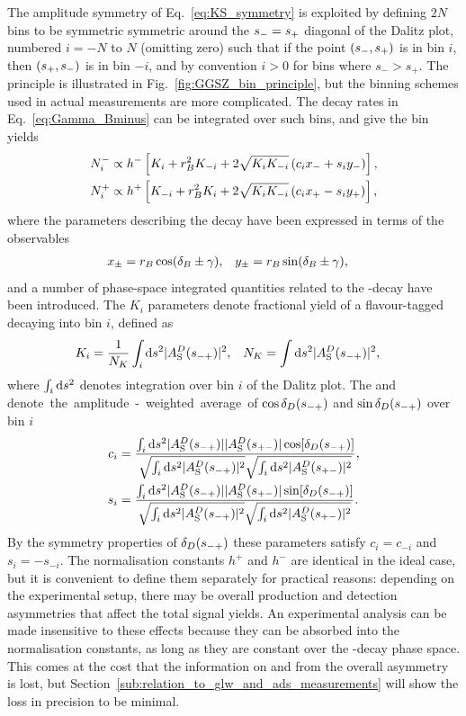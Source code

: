 The amplitude symmetry of Eq.~\eqref{eq:KS_symmetry} is exploited by defining $2N$ bins to be symmetric symmetric around the $s_-=s_+$ diagonal of the Dalitz plot, numbered $i=-N$ to $N$ (omitting zero) such that if the point $(s_-, s_+)$ is in bin $i$, then $(s_+, s_-)$ is in bin $-i$, and by convention $i>0$ for bins where $s_- >s_+$. The principle is illustrated in Fig.~\ref{fig:GGSZ_bin_principle}, but the binning schemes used in actual measurements are more complicated. The decay rates in Eq.~\eqref{eq:Gamma_Bminus} can be integrated over such bins, and give the bin yields
\begin{align}
\begin{split}    \label{eq:base_GGSZ_yields}
    N^-_i &\propto h^- \left[K_i + r_{B}^2K_{-i} + 2\sqrt{K_iK_{-i}}\left(c_ix_-+s_iy_-\right)\right], \\
    N^+_i &\propto h^+ \left[K_{-i} + r_{B}^2K_i + 2\sqrt{K_iK_{-i}}\left(c_ix_+-s_iy_+\right)\right],
\end{split}
\end{align}
where the parameters describing the \B decay have been expressed in terms of the observables
\begin{align}
    x_\pm &= r_{B} \cos (\delta_{B} \pm \gamma), & y_\pm &= r_{B} \sin (\delta_{B} \pm \gamma),
\end{align}
 and a number of phase-space integrated quantities related to the \D-decay have been introduced. The $K_i$ parameters denote fractional yield of a flavour-tagged \Dz decaying into bin $i$, defined as
\begin{align}\label{eq:base_ki}
    K_i &= \frac{1}{N_K}\int_i\text{d}s^2 |A_{\rm S}^{D}(s_{-+})|^2, &
    N_K &=\int\text{d}s^2 |A_{\rm S}^{D}(s_{-+})|^2,
\end{align}
where $\int_i \text d s^2$ denotes integration over bin $i$ of the Dalitz plot. The \ci and \si denote the amplitude-weighted average of $\cos \delta_D(s_{-+})$ and $\sin \delta_D(s_{-+})$ over bin $i$
\begin{align}\label{eq:ci_si}
\begin{split}
    c_i &= \frac
    {\int_i \text{d}s^2 |A_{\rm S}^{D}(s_{-+})||A_{\rm S}^{D}(s_{+-})|\cos[\delta_D(s_{-+})]}
    {\sqrt{\int_i \text{d}s^2 |A_{\rm S}^{D}(s_{-+})|^2}\sqrt{\int_i \text{d}s^2 |A_{\rm S}^{D}(s_{+-})|^2}}, \\
    s_i &= \frac
    {\int_i \text{d}s^2 |A_{\rm S}^{D}(s_{-+})||A_{\rm S}^{D}(s_{+-})|\sin[\delta_D(s_{-+})]}
    {\sqrt{\int_i \text{d}s^2 |A_{\rm S}^{D}(s_{-+})|^2}\sqrt{\int_i \text{d}s^2 |A_{\rm S}^{D}(s_{+-})|^2}}.
\end{split}
\end{align}
By the symmetry properties of $\delta_D(s_{-+})$ these parameters satisfy ${c_i=c_{-i}}$ and ${s_i=-s_{-i}}$. The normalisation constants $h^+$ and $h^-$ are identical in the ideal case, but it is convenient to define them separately for practical reasons: depending on the experimental setup, there may be overall production and detection asymmetries that affect the total signal yields. An experimental analysis can be made insensitive to these effects because they can be absorbed into the normalisation constants, as long as they are constant over the \D-decay phase space. This comes at the cost that the information on \xpm and \ypm from the overall \CP asymmetry is lost, but Section~\ref{sub:relation_to_glw_and_ads_measurements} will show the loss in precision to be minimal.
